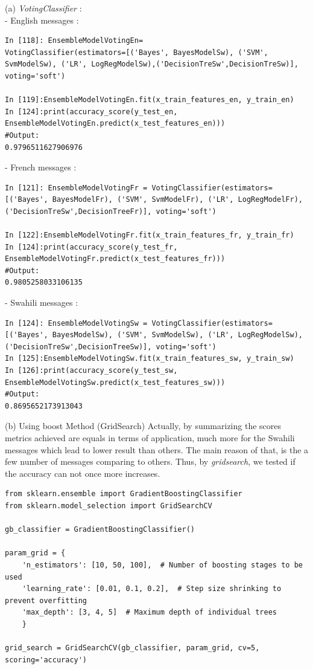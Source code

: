 \documentclass[12pt,a4paper, oneside]{book}
\begin{document}
(a) \textit{VotingClassifier} : \\

- English messages :
\begin{lstlisting}[style=stylejupyter]
In [118]: EnsembleModelVotingEn= 			 VotingClassifier(estimators=[('Bayes', BayesModelSw), ('SVM', SvmModelSw), ('LR', LogRegModelSw),('DecisionTreSw',DecisionTreSw)], voting='soft') 

In [119]:EnsembleModelVotingEn.fit(x_train_features_en, y_train_en) 
In [124]:print(accuracy_score(y_test_en, EnsembleModelVotingEn.predict(x_test_features_en)))
#Output:
0.9796511627906976
\end{lstlisting} 

- French messages :
\begin{lstlisting}[style=stylejupyter]
In [121]: EnsembleModelVotingFr = VotingClassifier(estimators=[('Bayes', BayesModelFr), ('SVM', SvmModelFr), ('LR', LogRegModelFr),('DecisionTreSw',DecisionTreeFr)], voting='soft')

In [122]:EnsembleModelVotingFr.fit(x_train_features_fr, y_train_fr)
In [124]:print(accuracy_score(y_test_fr, EnsembleModelVotingFr.predict(x_test_features_fr)))
#Output:
0.9805258033106135
\end{lstlisting}  

- Swahili messages : 
\begin{lstlisting}[style=stylejupyter]
In [124]: EnsembleModelVotingSw = VotingClassifier(estimators=[('Bayes', BayesModelSw), ('SVM', SvmModelSw), ('LR', LogRegModelSw),('DecisionTreSw',DecisionTreeSw)], voting='soft')
In [125]:EnsembleModelVotingSw.fit(x_train_features_sw, y_train_sw)
In [126]:print(accuracy_score(y_test_sw, EnsembleModelVotingSw.predict(x_test_features_sw)))
#Output:
0.8695652173913043
\end{lstlisting}  

(b) Using boost Method (GridSearch) 
Actually, by summarizing the scores metrics achieved are equals in terms of application, much more for the Swahili messages which lead to lower result than others. The main reason of that, is the a few number of messages comparing to others. Thus, by \textit{gridsearch}, we tested if the accuracy can not once more increases.
\begin{lstlisting}[style=stylejupyter]
from sklearn.ensemble import GradientBoostingClassifier
from sklearn.model_selection import GridSearchCV 
	
gb_classifier = GradientBoostingClassifier() 
	
param_grid = {
	'n_estimators': [10, 50, 100],  # Number of boosting stages to be used
	'learning_rate': [0.01, 0.1, 0.2],  # Step size shrinking to prevent overfitting
	'max_depth': [3, 4, 5]  # Maximum depth of individual trees
	}
	
grid_search = GridSearchCV(gb_classifier, param_grid, cv=5, scoring='accuracy')
\end{lstlisting}
\end{document}
